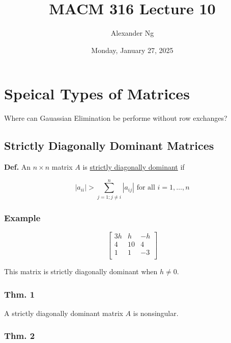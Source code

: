 \documentclass[12pt]{article}
\begin{document}
\renewcommand{\arraystretch}{1.25} %
\setlength{\arraycolsep}{12pt}

\title{MACM 316 Lecture 10}
\author{Alexander Ng}
\date{Monday, January 27, 2025}

\maketitle

\section{Speical Types of Matrices}

\noindent
Where can Gauassian Elimination be performe without row exchanges?

\subsection{Strictly Diagonally Dominant Matrices}

\textbf{Def.} An $n\times n$ matrix $A$ is \uline{strictly diagonally dominant} 
if 

\begin{equation*}
  |a_{ii}| > \sum_{j=1; j\ne i}^{n} |a_{ij}| \text{ for all } i=1,\dots,n
\end{equation*}

\subsubsection*{Example}

\begin{equation*}
  \begin{bmatrix}
  3h & h & -h\\
  4 & 10 & 4\\
  1 & 1 & -3\\
  \end{bmatrix}
\end{equation*}

This matrix is strictly diagonally dominant when $h\ne 0$.

\subsubsection{Thm. 1}

A strictly diagonally dominant matrix $A$ is nonsingular.

\subsubsection{Thm. 2}
\end{document}
